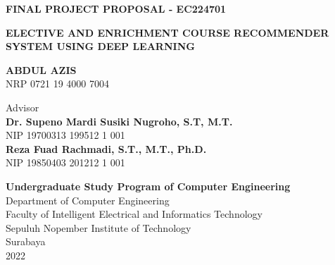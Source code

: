 {

\textbf{\large FINAL PROJECT PROPOSAL - EC224701}

\vspace{2cm}

\begin{Large}
    \uppercase{\textbf{Elective and Enrichment Course Recommender System using Deep Learning}}
\end{Large}

\vspace{2cm}

\begin{large}
    \uppercase{\textbf{Abdul Azis}} \\
    NRP 0721 19 4000 7004

    \vspace{2cm}

    Advisor \\
    \textbf{Dr. Supeno Mardi Susiki Nugroho, S.T, M.T.} \\
    NIP 19700313 199512 1 001 \\

    \textbf{Reza Fuad Rachmadi, S.T., M.T., Ph.D.} \\
    NIP 19850403 201212 1 001 \\
\end{large}

\vspace{2cm}

\textbf{Undergraduate Study Program of Computer Engineering} \\
Department of Computer Engineering \\
Faculty of Intelligent Electrical and Informatics Technology \\
Sepuluh Nopember Institute of Technology \\

Surabaya \\
2022 \\
}
